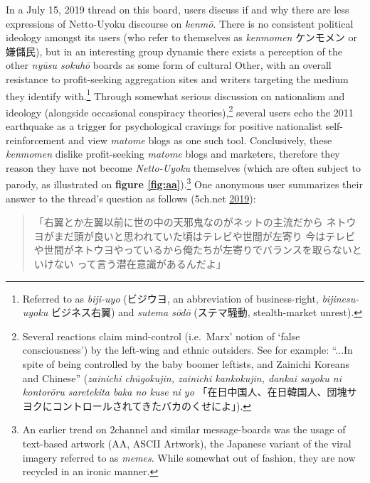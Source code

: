 \documentclass[10pt,british,A4paper,oneside]{memoir}
\begin{document}
In a July 15, 2019 thread on this board, users discuss if and why there
are less expressions of Netto-Uyoku discourse on \emph{kenmō}. There is
no consistent political ideology amongst its users (who refer to
themselves as \emph{kenmomen} ケンモメン or 嫌儲民), but in an
interesting group dynamic there exists a perception of the other \emph{nyūsu
sokuhō} boards as some form of cultural Other, with an overall resistance to
profit-seeking aggregation sites and writers targeting the medium they
identify with.\footnote{Referred to as \emph{biji-uyo} (ビジウヨ, an
  abbreviation of business-right, \emph{bijinesu-uyoku} ビジネス右翼)
  and \emph{sutema sōdō} (ステマ騒動, stealth-market unrest).} Through
somewhat serious discussion on nationalism and ideology (alongside
occasional conspiracy theories),\footnote{Several reactions claim
  mind-control (i.e.~Marx' notion of `false consciousness') by the
  left-wing and ethnic outsiders. See for example: ``...In spite of
  being controlled by the baby boomer leftists, and Zainichi Koreans and
  Chinese'' (\emph{zainichi chūgokujin, zainichi kankokujin, dankai
  sayoku ni kontorōru saretekita baka no kuse ni yo}
  「在日中国人、在日韓国人、団塊サヨクにコントロールされてきたバカのくせによ」).}
several users echo the 2011 earthquake as a trigger for psychological
cravings for positive nationalist self-reinforcement and view
\emph{matome} blogs as one such tool. Conclusively, these
\emph{kenmomen} dislike profit-seeking \emph{matome} blogs and
marketers, therefore they reason they have not become \emph{Netto-Uyoku}
themselves (which are often subject to parody, as illustrated on
\textbf{figure \ref{fig:aa}}).\footnote{An earlier trend on 2channel and
  similar message-boards was the usage of text-based artwork (AA, ASCII
  Artwork), the Japanese variant of the viral imagery referred to as
  \emph{memes}. While somewhat out of fashion, they are now recycled in
  an ironic manner.} One anonymous user summarizes their answer to the
thread's question as follows (5ch.net
\protect\hyperlink{ref-5ch.net_eng._2019}{2019}):

\begin{quote}
「右翼とか左翼以前に世の中の天邪鬼なのがネットの主流だから\newline
ネトウヨがまだ頭が良いと思われていた頃はテレビや世間が左寄り\newline
今はテレビや世間がネトウヨやっているから俺たちが左寄りでバランスを取らないといけない\newline
って言う潜在意識があるんだよ」
\end{quote}
\end{document}
